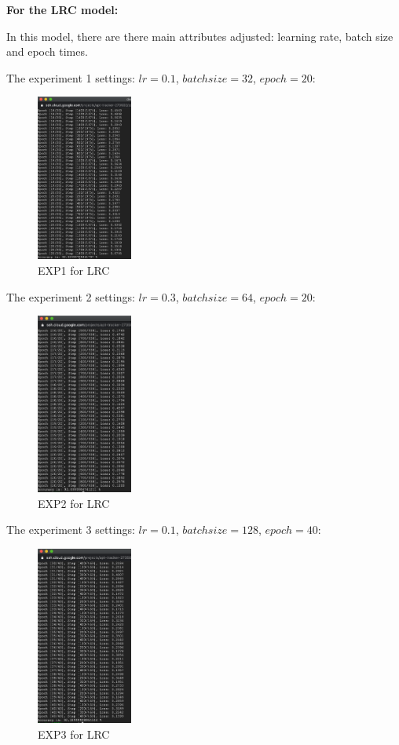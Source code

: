 \documentclass{article}
\begin{document}
\textbf{For the LRC model:}

In this model, there are there main attributes adjusted: learning rate, batch size and epoch times.

The experiment 1 settings: $lr=0.1$, $batch size=32$, $epoch=20$:
\begin{figure}[H]
    \centering
    \caption{EXP1 for LRC}
    \includegraphics[width=0.28\textwidth]{lrc_1}
\end{figure}

The experiment 2 settings: $lr=0.3$, $batch size=64$, $epoch=20$:
\begin{figure}[H]
    \centering
    \caption{EXP2 for LRC}
    \includegraphics[width=0.28\textwidth]{lrc_2}
\end{figure}

The experiment 3 settings: $lr=0.1$, $batch size=128$, $epoch=40$:
\begin{figure}[H]
    \centering
    \caption{EXP3 for LRC}
    \includegraphics[width=0.28\textwidth]{lrc_3}
\end{figure}
\end{document}

